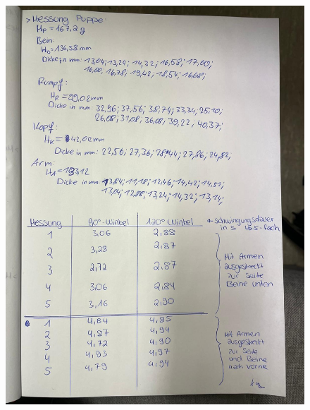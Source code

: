 \begin{figure}
    \centering
    \includegraphics[width=\textwidth]{Messdaten/Daten2.jpg}
\end{figure}